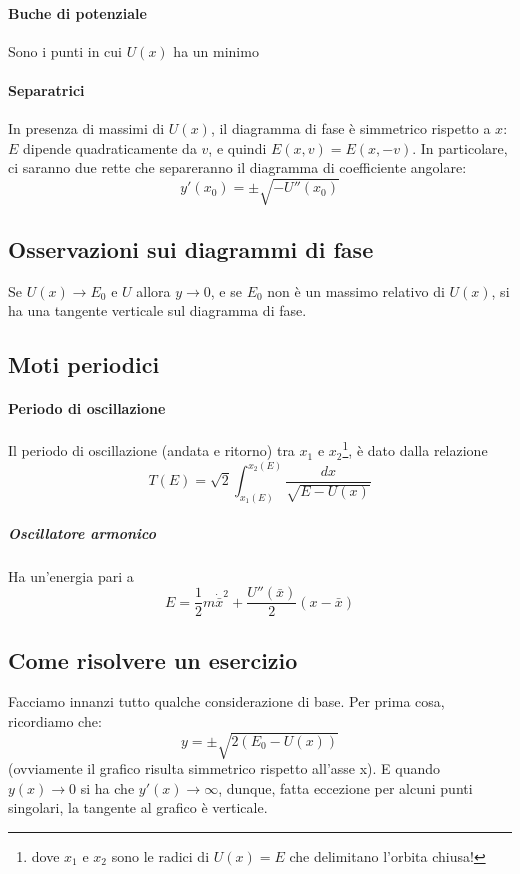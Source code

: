 \documentclass[a4paper,12pt]{article}
\begin{document}
\paragraph{Buche di potenziale}
Sono i punti in cui $U(x)$ ha un minimo
\paragraph{Separatrici}
In presenza di massimi di $U(x)$, il diagramma di fase è simmetrico rispetto a $x$: $E$ dipende quadraticamente da $v$, e quindi $E(x, v) = E(x, -v)$.
In particolare, ci saranno due rette che separeranno il diagramma di coefficiente angolare:
$$y'(x_0) = \pm\sqrt{-U''(x_0)}$$

\subsection{Osservazioni sui diagrammi di fase}
Se $U(x) \to E_0$ e $U$ allora $y \to 0$, e se $E_0$ non è un massimo relativo di $U(x)$, si ha una tangente verticale sul diagramma di fase.


\subsection{Moti periodici}
\paragraph{Periodo di oscillazione}
Il periodo di oscillazione (andata e ritorno) tra $x_1$ e $x_2$\footnote{dove $x_1$ e $x_2$ sono le radici di $U(x) = E $ che delimitano l'orbita chiusa! }, è dato dalla relazione
$$ T(E) = \sqrt{2}\int_{x_1(E)}^{x_2(E)} \dfrac{dx}{\sqrt{E-U(x)}}$$
\subparagraph{Oscillatore armonico}
Ha un'energia pari a
$$ E = \dfrac{1}{2} m \dot{\bar{x}}^2 + \dfrac{U''(\bar{x})}{2} (x-\bar{x})$$
\subsection{Come risolvere un esercizio}
Facciamo innanzi tutto qualche considerazione di base. Per prima cosa, ricordiamo che:
$$y = \pm \sqrt{2(E_0-U(x))}$$
    (ovviamente il grafico risulta simmetrico rispetto all'asse x).
E quando $y(x)\to 0$ si ha che $y'(x) \to \infty$, dunque, fatta eccezione per alcuni punti singolari, la tangente al grafico è verticale.
\end{document}
